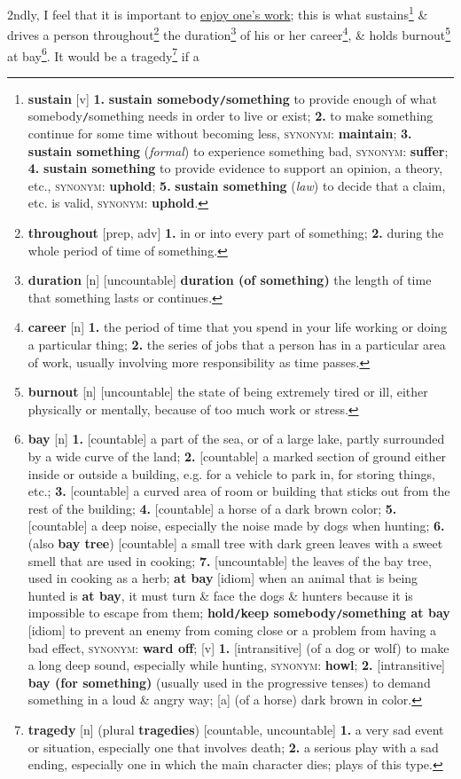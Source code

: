 \documentclass{article}
\numberwithin{equation}{section}
\begin{document}
2ndly, I feel that it is important to \href{https://terrytao.wordpress.com/career-advice/enjoy-your-work/}{enjoy one's work}; this is what sustains\footnote{\textbf{sustain} [v] \textbf{1.} \textbf{sustain somebody\texttt{/}something} to provide enough of what somebody\texttt{/}something needs in order to live or exist; \textbf{2.} to make something continue for some time without becoming less, \textsc{synonym}: \textbf{maintain}; \textbf{3.} \textbf{sustain something} (\textit{formal}) to experience something bad, \textsc{synonym}: \textbf{suffer}; \textbf{4.} \textbf{sustain something} to provide evidence to support an opinion, a theory, etc., \textsc{synonym}: \textbf{uphold}; \textbf{5.} \textbf{sustain something} (\textit{law}) to decide that a claim, etc. is valid, \textsc{synonym}: \textbf{uphold}.} \& drives a person throughout\footnote{\textbf{throughout} [prep, adv] \textbf{1.} in or into every part of something; \textbf{2.} during the whole period of time of something.} the duration\footnote{\textbf{duration} [n] [uncountable] \textbf{duration (of something)} the length of time that something lasts or continues.} of his or her career\footnote{\textbf{career} [n] \textbf{1.} the period of time that you spend in your life working or doing a particular thing; \textbf{2.} the series of jobs that a person has in a particular area of work, usually involving more responsibility as time passes.}, \& holds burnout\footnote{\textbf{burnout} [n] [uncountable] the state of being extremely tired or ill, either physically or mentally, because of too much work or stress.} at bay\footnote{\textbf{bay} [n] \textbf{1.} [countable] a part of the sea, or of a large lake, partly surrounded by a wide curve of the land; \textbf{2.} [countable] a marked section of ground either inside or outside a building, e.g. for a vehicle to park in, for storing things, etc.; \textbf{3.} [countable] a curved area of room or building that sticks out from the rest of the building; \textbf{4.} [countable] a horse of a dark brown color; \textbf{5.} [countable] a deep noise, especially the noise made by dogs when hunting; \textbf{6.} (also \textbf{bay tree}) [countable] a small tree with dark green leaves with a sweet smell that are used in cooking; \textbf{7.} [uncountable] the leaves of the bay tree, used in cooking as a herb; \textbf{at bay} [idiom] when an animal that is being hunted is \textbf{at bay}, it must turn \& face the dogs \& hunters because it is impossible to escape from them; \textbf{hold\texttt{/}keep somebody\texttt{/}something at bay} [idiom] to prevent an enemy from coming close or a problem from having a bad effect, \textsc{synonym}: \textbf{ward off}; [v] \textbf{1.} [intransitive] (of a dog or wolf) to make a long deep sound, especially while hunting, \textsc{synonym}: \textbf{howl}; \textbf{2.} [intransitive] \textbf{bay (for something)} (usually used in the progressive tenses) to demand something in a loud \& angry way; [a] (of a horse) dark brown in color.}. It would be a tragedy\footnote{\textbf{tragedy} [n] (plural \textbf{tragedies}) [countable, uncountable] \textbf{1.} a very sad event or situation, especially one that involves death; \textbf{2.} a serious play with a sad ending, especially one in which the main character dies; plays of this type.} if a 
\end{document}
